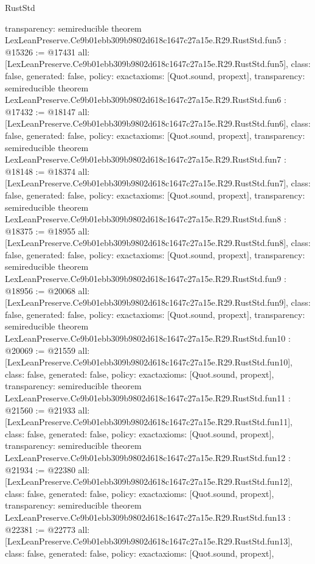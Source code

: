 \begin{lexlean}{RustStd}
\begin{coremodule}
{  transparency: semireducible
}
theorem LexLeanPreserve.Ce9b01ebb309b9802d618c1647c27a15e.R29.RustStd.fun5 : @15326 := @17431 {
  all: [LexLeanPreserve.Ce9b01ebb309b9802d618c1647c27a15e.R29.RustStd.fun5],
  class: false,
  generated: false,
  policy: exact{axioms: [Quot.sound, propext]},
  transparency: semireducible
}
theorem LexLeanPreserve.Ce9b01ebb309b9802d618c1647c27a15e.R29.RustStd.fun6 : @17432 := @18147 {
  all: [LexLeanPreserve.Ce9b01ebb309b9802d618c1647c27a15e.R29.RustStd.fun6],
  class: false,
  generated: false,
  policy: exact{axioms: [Quot.sound, propext]},
  transparency: semireducible
}
theorem LexLeanPreserve.Ce9b01ebb309b9802d618c1647c27a15e.R29.RustStd.fun7 : @18148 := @18374 {
  all: [LexLeanPreserve.Ce9b01ebb309b9802d618c1647c27a15e.R29.RustStd.fun7],
  class: false,
  generated: false,
  policy: exact{axioms: [Quot.sound, propext]},
  transparency: semireducible
}
theorem LexLeanPreserve.Ce9b01ebb309b9802d618c1647c27a15e.R29.RustStd.fun8 : @18375 := @18955 {
  all: [LexLeanPreserve.Ce9b01ebb309b9802d618c1647c27a15e.R29.RustStd.fun8],
  class: false,
  generated: false,
  policy: exact{axioms: [Quot.sound, propext]},
  transparency: semireducible
}
theorem LexLeanPreserve.Ce9b01ebb309b9802d618c1647c27a15e.R29.RustStd.fun9 : @18956 := @20068 {
  all: [LexLeanPreserve.Ce9b01ebb309b9802d618c1647c27a15e.R29.RustStd.fun9],
  class: false,
  generated: false,
  policy: exact{axioms: [Quot.sound, propext]},
  transparency: semireducible
}
theorem LexLeanPreserve.Ce9b01ebb309b9802d618c1647c27a15e.R29.RustStd.fun10 : @20069 := @21559 {
  all: [LexLeanPreserve.Ce9b01ebb309b9802d618c1647c27a15e.R29.RustStd.fun10],
  class: false,
  generated: false,
  policy: exact{axioms: [Quot.sound, propext]},
  transparency: semireducible
}
theorem LexLeanPreserve.Ce9b01ebb309b9802d618c1647c27a15e.R29.RustStd.fun11 : @21560 := @21933 {
  all: [LexLeanPreserve.Ce9b01ebb309b9802d618c1647c27a15e.R29.RustStd.fun11],
  class: false,
  generated: false,
  policy: exact{axioms: [Quot.sound, propext]},
  transparency: semireducible
}
theorem LexLeanPreserve.Ce9b01ebb309b9802d618c1647c27a15e.R29.RustStd.fun12 : @21934 := @22380 {
  all: [LexLeanPreserve.Ce9b01ebb309b9802d618c1647c27a15e.R29.RustStd.fun12],
  class: false,
  generated: false,
  policy: exact{axioms: [Quot.sound, propext]},
  transparency: semireducible
}
theorem LexLeanPreserve.Ce9b01ebb309b9802d618c1647c27a15e.R29.RustStd.fun13 : @22381 := @22773 {
  all: [LexLeanPreserve.Ce9b01ebb309b9802d618c1647c27a15e.R29.RustStd.fun13],
  class: false,
  generated: false,
  policy: exact{axioms: [Quot.sound, propext]},
}
\end{coremodule}
\end{lexlean}
